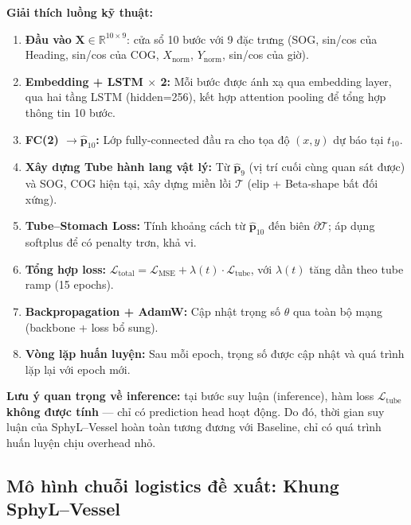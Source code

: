 \documentclass{IEEEtran}
\newcommand{\R}{\mathbb{R}}
\begin{document}
\textbf{Giải thích luồng kỹ thuật:}
\begin{enumerate}
  \item \textbf{Đầu vào} $\mathbf{X} \in \R^{10 \times 9}$: cửa sổ 10 bước
        với 9 đặc trưng (SOG, sin/cos của Heading, sin/cos của COG,
        $X_{\text{norm}}$, $Y_{\text{norm}}$, sin/cos của giờ).
  \item \textbf{Embedding + LSTM $\times$ 2:} Mỗi bước được ánh xạ
        qua embedding layer, qua hai tầng LSTM (hidden=256),
        kết hợp attention pooling để tổng hợp thông tin 10 bước.
  \item \textbf{FC(2) $\rightarrow \hat{\mathbf{p}}_{10}$:}
        Lớp fully-connected đầu ra cho tọa độ $(x,y)$ dự báo tại $t_{10}$.
  \item \textbf{Xây dựng Tube hành lang vật lý:}
        Từ $\hat{\mathbf{p}}_9$ (vị trí cuối cùng quan sát được) và
        SOG, COG hiện tại, xây dựng miền lồi $\mathcal{T}$
        (elip + Beta-shape bất đối xứng).
  \item \textbf{Tube--Stomach Loss:}
        Tính khoảng cách từ $\hat{\mathbf{p}}_{10}$ đến biên $\partial\mathcal{T}$;
        áp dụng softplus để có penalty trơn, khả vi.
  \item \textbf{Tổng hợp loss:}
        $\mathcal{L}_{\text{total}} = \mathcal{L}_{\text{MSE}}
        + \lambda(t) \cdot \mathcal{L}_{\text{tube}}$,
        với $\lambda(t)$ tăng dần theo tube ramp (15 epochs).
  \item \textbf{Backpropagation + AdamW:} Cập nhật trọng số $\theta$
        qua toàn bộ mạng (backbone + loss bổ sung).
  \item \textbf{Vòng lặp huấn luyện:} Sau mỗi epoch, trọng số được
        cập nhật và quá trình lặp lại với epoch mới.
\end{enumerate}

\textbf{Lưu ý quan trọng về inference:}
tại bước suy luận (inference), hàm loss $\mathcal{L}_{\text{tube}}$
\textbf{không được tính} --- chỉ có prediction head hoạt động.
Do đó, thời gian suy luận của SphyL--Vessel hoàn toàn tương đương
với Baseline, chỉ có quá trình huấn luyện chịu overhead nhỏ.

\subsection{Mô hình chuỗi logistics đề xuất: Khung SphyL--Vessel}\label{sec:sphyl-model}
\end{document}

